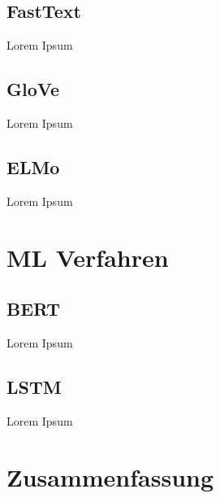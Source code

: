 
\subsection{FastText}

Lorem Ipsum

\subsection{GloVe}


Lorem Ipsum

\subsection{ELMo}

Lorem Ipsum

\section{\acl{ML} Verfahren}


\subsection{BERT}

Lorem Ipsum

\subsection{LSTM}

Lorem Ipsum

\section{Zusammenfassung}
